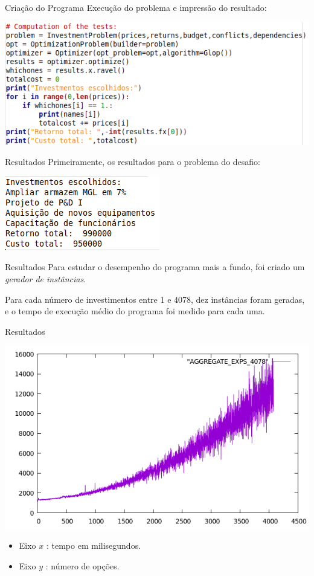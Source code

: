 \documentclass{beamer}
\begin{document}
\begin{frame}{Criação do Programa}
Execução do problema e impressão do resultado:
\begin{center}
\includegraphics[scale=0.4]{CONCLUSION_FOR_PRESENTATION.png}
\end{center}
\end{frame}

\begin{frame}{Resultados}
Primeiramente, os resultados para o problema do desafio:\pause
\begin{center}
\includegraphics[scale=0.8]{RESULT_FOR_PRESENTATION.png}
\end{center}
\end{frame}

\begin{frame}{Resultados}
Para estudar o desempenho do programa mais a fundo, foi criado um
\emph{gerador de instâncias}.\pause

Para cada número de investimentos entre 1 e 4078, dez instâncias foram geradas,
e o tempo de execução médio do programa foi medido para cada uma.
\end{frame}

\begin{frame}{Resultados}
\begin{center}
\includegraphics[scale=0.3]{GRAPH_FOR_PRESENTATION.png}
\end{center}
\begin{itemize}
\item Eixo $x$ : tempo em milisegundos.
\item Eixo $y$ : número de opções.
\end{itemize}
\end{frame}
\end{document}
